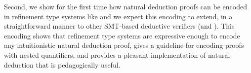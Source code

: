 Second, we show for the first time how
natural deduction proofs can be encoded
in refinement type systems like \toolname
and we expect this encoding to extend,
in a straightforward manner to other
SMT-based deductive verifiers
(\eg \dafny and \fstar).
%
This encoding shows that refinement type systems
are expressive enough to encode any intuitionistic natural deduction proof,
gives a guideline for encoding proofs
with nested quantifiers, and provides
a pleasant implementation of
natural deduction that
is pedagogically useful.
